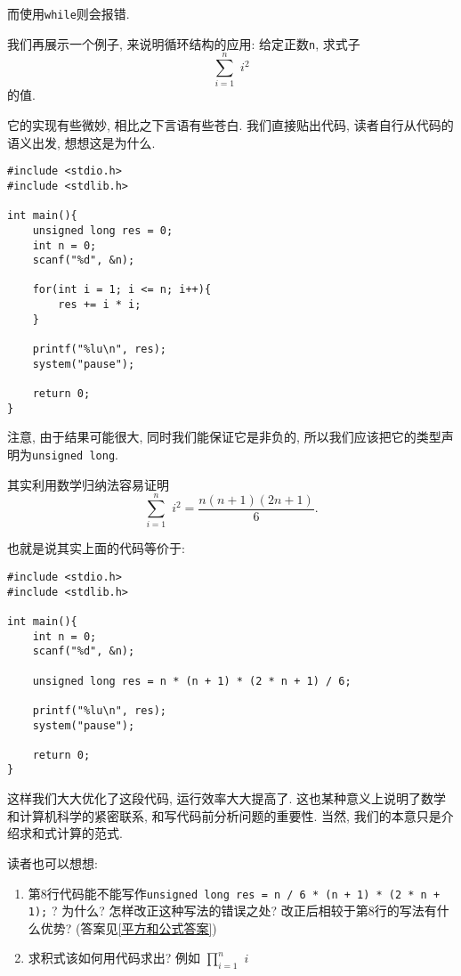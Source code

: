             而使用\texttt{while}则会报错.

            我们再展示一个例子, 来说明循环结构的应用: 给定正数\texttt{n}, 求式子
                \[ \sum^ n _ {i = 1} \, \, i ^ 2 \]
            的值.

            它的实现有些微妙, 相比之下言语有些苍白. 我们直接贴出代码, 读者自行从代码的语义出发, 想想这是为什么.
\begin{lstlisting}
#include <stdio.h>
#include <stdlib.h>

int main(){
    unsigned long res = 0;
    int n = 0;
    scanf("%d", &n);

    for(int i = 1; i <= n; i++){
        res += i * i;
    }

    printf("%lu\n", res);
    system("pause");

    return 0;
}
\end{lstlisting}

            \begin{sloppypar}
            注意, 由于结果可能很大, 同时我们能保证它是非负的, 所以我们应该把它的类型声明为\texttt{unsigned long}.
            \end{sloppypar}

            其实利用数学归纳法容易证明
                \[ \sum ^n _{i = 1} \,\, i ^ 2 = \dfrac{n(n + 1)(2n + 1)}{6} .\]

            也就是说其实上面的代码等价于:
\begin{lstlisting}
#include <stdio.h>
#include <stdlib.h>

int main(){
    int n = 0;
    scanf("%d", &n);

    unsigned long res = n * (n + 1) * (2 * n + 1) / 6;

    printf("%lu\n", res);
    system("pause");

    return 0;
}
\end{lstlisting}

            这样我们大大优化了这段代码, 运行效率大大提高了. 这也某种意义上说明了数学和计算机科学的紧密联系, 和写代码前分析问题的重要性. 当然, 我们的本意只是介绍求和式计算的范式.

            读者也可以想想:
            \begin{enumerate}
                \item 第8行代码能不能写作\texttt{unsigned long res = n / 6 * (n + 1) * (2 * n + 1);} ? 为什么? 怎样改正这种写法的错误之处? 改正后相较于第8行的写法有什么优势? (答案见\ref{平方和公式答案})
                \item 求积式该如何用代码求出? 例如 $\displaystyle \prod ^n _{i = 1}\,\, i$
            \end{enumerate}

